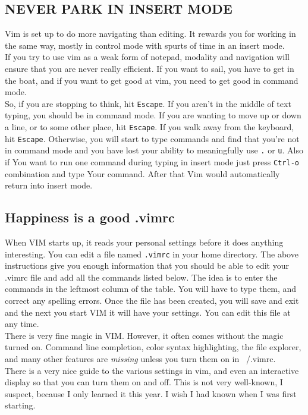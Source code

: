 \documentclass[a4paper, 12pt]{article}
\begin{document}
\subsection{NEVER PARK IN INSERT MODE}
\label{"NEVER PARK IN INSERT MODE"}
Vim is set up to do more navigating than editing. It rewards you for working in the same way, mostly in control mode with spurts of time in an insert mode.\\
If you try to use vim as a weak form of notepad, modality and navigation will ensure that you are never really efficient. If you want to sail, you have to get in the boat, and if you want to get good at vim, you need to get good in command mode.\\
So, if you are stopping to think, hit \texttt{Escape}. If you aren't in the middle of text typing, you should be in command mode. If you are wanting to move up or down a line, or to some other place, hit \texttt{Escape}. If you walk away from the keyboard, hit \texttt{Escape}. Otherwise, you will start to type commands and find that you're not in command mode and you have lost your ability to meaningfully use \texttt{.} or \texttt{u}. Also if You want to run one command during typing in insert mode just press \texttt{Ctrl-o} combination and type Your command. After that Vim would automatically return into insert mode. 
\subsection{Happiness is a good .vimrc}
\label{"Happiness is a good .vimrc"}
When VIM starts up, it reads your personal settings before it does anything interesting. You can edit a file named \texttt{.vimrc} in your home directory. The above instructions give you enough information that you should be able to edit your .vimrc file and add all the commands listed below. The idea is to enter the commands in the leftmost column of the table. You will have to type them, and correct any spelling errors. Once the file has been created, you will save and exit and the next you start VIM it will have your settings. You can edit this file at any time.\\
There is very fine magic in VIM. However, it often comes without the magic turned on. Command line completion, color syntax highlighting, the file explorer, and many other features are {\it missing} unless you turn them on in ~/.vimrc.\\
There is a very nice guide to the various settings in vim, and even an interactive display so that you can turn them on and off. This is not very well-known, I suspect, because I only learned it this year. I wish I had known when I was first starting.
\end{document}
